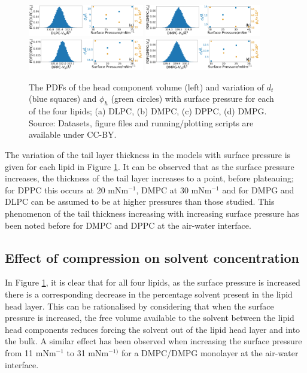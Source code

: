 \documentclass[twoside,twocolumn,9pt]{article}
\begin{document}
%
\begin{figure}
	\centering
	\includegraphics[width=0.45\textwidth]{figures/dlpc_vh_dt_phi}
	\includegraphics[width=0.45\textwidth]{figures/dmpc_vh_dt_phi}
	\includegraphics[width=0.45\textwidth]{figures/dppc_vh_dt_phi}
	\includegraphics[width=0.45\textwidth]{figures/dmpg_vh_dt_phi}
	\caption{The PDFs of the head component volume (left) and variation of $d_t$ (blue squares) and $\phi_h$ (green circles) with surface pressure for each of the four lipids; (a) DLPC, (b) DMPC, (c) DPPC, (d) DMPG. Source: Datasets, figure files and running/plotting scripts are available under CC-BY.\cite{mccluskey_2018}}
	\label{fig:lipresults}
\end{figure}
%
The variation of the tail layer thickness in the models with surface pressure is given for each lipid in Figure \ref{fig:lipresults}. It can be observed that as the surface pressure increases, the thickness of the tail layer increases to a point, before plateauing; for DPPC this occurs at 20 mNm$^{-1}$, DMPC at 30 mNm$^{-1}$ and for DMPG and DLPC can be assumed to be at higher pressures than those studied. This phenomenon of the tail thickness increasing with increasing surface pressure has been noted before for DMPC\cite{Bayerl1990} and DPPC\cite{Campbell2018} at the air-water interface.

\subsection{Effect of compression on solvent concentration}
In Figure \ref{fig:lipresults}, it is clear that for all four lipids, as the surface pressure is increased there is a corresponding decrease in the percentage solvent present in the lipid head layer. This can be rationalised by considering that when the surface pressure is increased, the free volume available to the solvent between the lipid head components reduces forcing the solvent out of the lipid head layer and into the bulk. A similar effect has been observed when increasing the surface pressure from 11 mNm$^{-1}$ to 31 mNm$^{-1)}$ for a DMPC/DMPG monolayer at the air-water interface.\cite{Bayerl1990}
\end{document}

